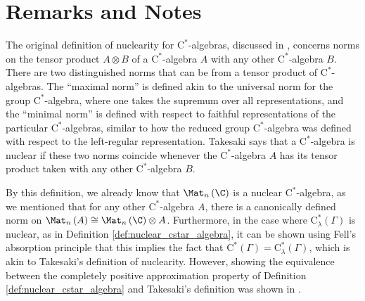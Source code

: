 \section{Remarks and Notes}%
The original definition of nuclearity for $\mathrm{C}^{\ast}$-algebras, discussed in \cite{cross_norm_takesaki}, concerns norms on the tensor product $A\otimes B$ of a $\mathrm{C}^{\ast}$-algebra $A$ with any other $\mathrm{C}^{\ast}$-algebra $B$. There are two distinguished norms that can be from a tensor product of $\mathrm{C}^{\ast}$-algebras. The ``maximal norm'' is defined akin to the universal norm for the group $\mathrm{C}^{\ast}$-algebra, where one takes the supremum over all representations, and the ``minimal norm'' is defined with respect to faithful representations of the particular $\mathrm{C}^{\ast}$-algebras, similar to how the reduced group $\mathrm{C}^{\ast}$-algebra was defined with respect to the left-regular representation. Takesaki says that a $\mathrm{C}^{\ast}$-algebra is nuclear if these two norms coincide whenever the $\mathrm{C}^{\ast}$-algebra $A$ has its tensor product taken with any other $\mathrm{C}^{\ast}$-algebra $B$.\newline

By this definition, we already know that $\Mat_n\left( \C \right)$ is a nuclear $\mathrm{C}^{\ast}$-algebra, as we mentioned that for any other $\mathrm{C}^{\ast}$-algebra $A$, there is a canonically defined norm on $\Mat_n\left( A \right)\cong \Mat_n\left( \C \right)\otimes A$. Furthermore, in the case where $\mathrm{C}^{\ast}_{\lambda}\left( \Gamma \right)$ is nuclear, as in Definition \ref{def:nuclear_cstar_algebra}, it can be shown using Fell's absorption principle that this implies the fact that $\mathrm{C}^{\ast}\left( \Gamma \right) = \mathrm{C}^{\ast}_{\lambda}\left( \Gamma \right)$, which is akin to Takesaki's definition of nuclearity. However, showing the equivalence between the completely positive approximation property of Definition \ref{def:nuclear_cstar_algebra} and Takesaki's definition was shown in \cite{choi_nuclearity}.
